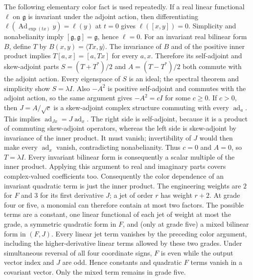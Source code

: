 The following elementary color fact is used repeatedly. If a real linear
functional $\ell$ on $\mathfrak g$ is invariant under the adjoint action,
then differentiating $\ell(\operatorname{Ad}_{\exp(tx)}y)=\ell(y)$ at $t=0$
gives $\ell([x,y])=0$. Simplicity and nonabelianity imply
$[\mathfrak g,\mathfrak g]=\mathfrak g$, hence $\ell=0$. For an invariant
real bilinear form $B$, define $T$ by $B(x,y)=\langle Tx,y\rangle$. The
invariance of $B$ and of the positive inner product implies
$T[a,x]=[a,Tx]$ for every $a,x$. Therefore its self-adjoint and
skew-adjoint parts $S=(T+T^*)/2$ and $A=(T-T^*)/2$ both commute with the
adjoint action. Every eigenspace of $S$ is an ideal; the spectral theorem
and simplicity show $S=\lambda I$. Also $-A^2$ is positive self-adjoint
and commutes with the adjoint action, so the same argument gives
$-A^2=cI$ for some $c\ge0$. If $c>0$, then $J=A/\sqrt c$ is a skew-adjoint
complex structure commuting with every $\operatorname{ad}_a$. This implies
$\operatorname{ad}_{Jx}=J\operatorname{ad}_x$. The right side is
self-adjoint, because it is a product of commuting skew-adjoint operators,
whereas the left side is skew-adjoint by invariance of the inner product.
It must vanish; invertibility of $J$ would then make every
$\operatorname{ad}_x$ vanish, contradicting nonabelianity. Thus $c=0$ and
$A=0$, so $T=\lambda I$. Every invariant bilinear form is consequently a
scalar multiple of the inner product. Applying this argument to real and
imaginary parts covers complex-valued coefficients too.
Consequently the color dependence of an invariant quadratic term is just
the inner product. The engineering weights are $2$ for $F$ and $3$ for its first derivative $J$; a jet of order $r$ has weight $r+2$. At grade four or five, a monomial can therefore contain at most two factors. The possible terms are a constant, one linear functional of each jet of weight at most the grade, a symmetric quadratic form in $F$, and (only at grade five) a mixed bilinear form in $(F,J)$.
Every linear jet term vanishes by the preceding color argument, including the higher-derivative linear terms allowed by these two grades. Under simultaneous
reversal of all four coordinate signs, $F$ is even while the output vector
index and $J$ are odd. Hence constants and quadratic $F$ terms vanish in a
covariant vector. Only the mixed term remains in grade five.

